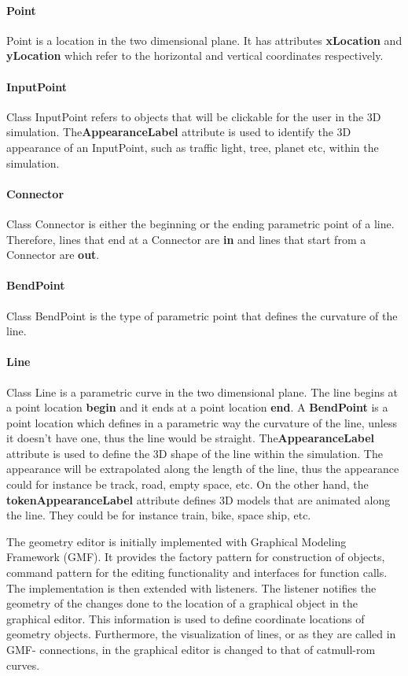 \paragraph{Point}
Point is a location in the two dimensional plane. It has attributes \textbf{xLocation} and \textbf{yLocation} which refer to the horizontal and vertical coordinates respectively.

\paragraph{InputPoint}
Class InputPoint refers to objects that will be clickable for the user in the 3D simulation. The\textbf{AppearanceLabel} attribute is used to identify the 3D appearance of an InputPoint, such as traffic light, tree, planet etc, within the simulation.

\paragraph{Connector}
Class Connector is either the beginning or the ending parametric point of a line. Therefore, lines that end at a Connector are \textbf{in} and lines that start from a Connector are \textbf{out}.

\paragraph{BendPoint}
Class BendPoint is the type of parametric point that defines the curvature of the line.

\paragraph{Line}
Class Line is a parametric curve in the two dimensional plane. The line begins at a point location \textbf{begin} and it ends at a point location \textbf{end}. A \textbf{BendPoint} is a point location which defines in a parametric way the curvature of the line, unless it doesn't have one, thus the line would be straight. The\textbf{AppearanceLabel} attribute is used to define the 3D shape of the line within the simulation. The appearance will be extrapolated along the length of the line, thus the appearance could for instance be track, road, empty space, etc. On the other hand, the \textbf{tokenAppearanceLabel} attribute defines 3D models that are animated along the line. They could be for instance train, bike, space ship, etc.

The geometry editor is initially implemented with Graphical Modeling Framework (GMF). It provides the factory pattern for construction of objects, command pattern for the editing functionality and interfaces for function calls. The implementation is then extended with listeners. The listener notifies the geometry of the changes done to the location of a graphical object in the graphical editor. This information is used to define coordinate locations of geometry objects. Furthermore, the visualization of lines, or as they are called in GMF- connections, in the graphical editor is changed to that of catmull-rom curves. 





